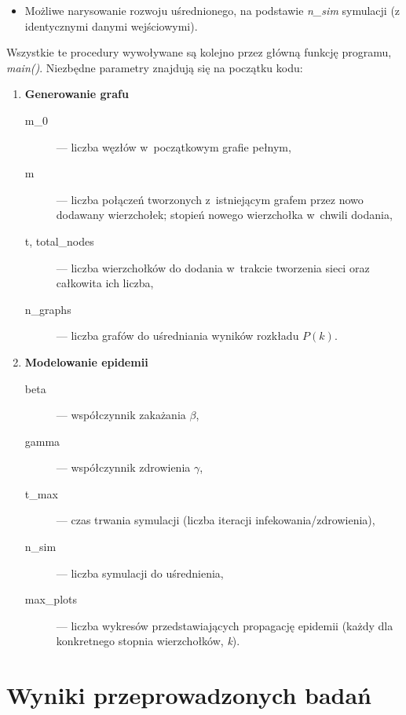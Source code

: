 \begin{enumerate}
\begin{enumerate}[label=\bfseries{\Roman*})]
\begin{enumerate}[label=\arabic*)]
    \begin{itemize}
    \item Możliwe narysowanie rozwoju uśrednionego, na podstawie \emph{n\_sim} symulacji (z identycznymi danymi wejściowymi).
    \end{itemize}
  \end{enumerate}
\end{enumerate}
Wszystkie te procedury wywoływane są kolejno przez główną funkcję programu, \emph{main()}. 
Niezbędne parametry znajdują się na początku kodu:
\begin{enumerate}[label=\bfseries{\Roman*})]
\item \textbf{Generowanie grafu} \hfill
  \begin{description}
  \item[m\_0] --- liczba węzłów w~początkowym grafie pełnym, 
  \item[m] --- liczba połączeń tworzonych z~istniejącym grafem przez nowo dodawany wierzchołek; stopień nowego wierzchołka w~chwili dodania, 
  \item[t, total\_nodes] --- liczba wierzchołków do dodania w~trakcie tworzenia sieci oraz całkowita ich liczba, 
  \item[n\_graphs] --- liczba grafów do uśredniania wyników rozkładu $P(k)$.
  \end{description}
\item \textbf{Modelowanie epidemii} \hfill
  \begin{description}
  \item[beta] --- współczynnik zakażania $\beta$, 
  \item[gamma] --- współczynnik zdrowienia $\gamma$, 
  \item[t\_max] --- czas trwania symulacji (liczba iteracji infekowania/zdrowienia), 
  \item[n\_sim] --- liczba symulacji do uśrednienia,
  \item[max\_plots] --- liczba wykresów przedstawiających propagację epidemii (każdy dla konkretnego stopnia wierzchołków, \emph{k}).
  \end{description}
\end{enumerate}

\newpage

\section{Wyniki przeprowadzonych badań} %
\label{sec:wyniki_testow}


\end{enumerate}
